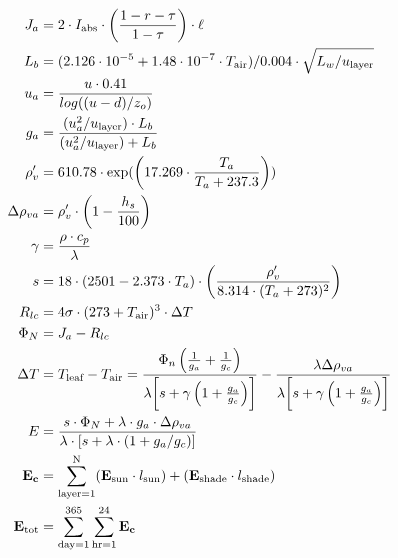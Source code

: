 \documentclass[10pt]{article}
\renewcommand{\marginnote}[2][]{}
\begin{document}
\begin{align}
 J_a &= 2 \cdot I_{\text{abs}} \cdot \left(\frac{1-r-\tau}{1-\tau}\right) \cdot \ell \label{eqn:Ja} \\
 L_b &= (2.126 \cdot 10^{-5} + 1.48 \cdot 10^{-7} \cdot T_\text{air}) / 0.004 \cdot \sqrt{L_w / u_{\text{layer}}} \label{eqn:Lb}\\
 u_a &= \frac{u \cdot 0.41}{log((u-d)/z_o)} \hspace{3.1in} \label{eqn:ua} \marginnote{I can not reconcile units}\\
 g_a &= \frac{(u_{a}^{2}/u_{\text{layer}}) \cdot L_b}{(u_{a}^{2}/u_{\text{layer}}) + L_b} \label{eqn:ga} \marginnote{I can not reconcile units}\\
 \rho_{v}^{\prime} &= 610.78 \cdot \exp(\left( 17.269 \cdot \frac{T_a}{T_a + 237.3} \right)) \label{eqn:rhop} \\
 \Delta \rho_{va} &= \rho_{v}^{\prime} \cdot \left( 1-\frac{h_s}{100} \right) \label{eqn:Deltarho} \\
 \gamma &= \frac{\rho \cdot c_p}{\lambda} \label{eqn:gamma} \\
 s &= 18 \cdot (2501 - 2.373 \cdot T_a) \cdot \left(\frac{\rho_{v}^{\prime}}{8.314 \cdot (T_a + 273)^2} \right) \label{eqn:s} \\
 R_{lc} &= 4 \sigma \cdot (273+T_{\text{air}})^3 \cdot \Delta T \label{eqn:Rlc} \\
 \Phi_N &= J_a - R_{lc} \label{eqn:PhiN} \\
 \Delta T &= T_{\text{leaf}} - T_{\text{air}} = \frac{\Phi_n \left(\frac{1}{g_a}+\frac{1}{g_c} \right)}{\lambda \biggl[ s+ \gamma \left( 1 + \frac{g_a}{g_c} \right) \biggr]} - \frac{\lambda \Delta \rho_{va}}{\lambda \biggl[ s+\gamma\left(1+\frac{g_a}{g_c}\right) \biggr] } \label{eqn:DeltaT} \marginnote{should thermal conductivity be in this equation?} \\
 E &= \frac{ s \cdot \Phi_N + \lambda \cdot g_a \cdot \Delta \rho_{va}}{\lambda \cdot [ s + \lambda \cdot (1+g_a / g_c)]} \label{eqn:E} \\
 \mathbf{E_c} &= \sum_{\text{layer}=1}^\text{N} (\mathbf{E_{\text{sun}}} \cdot l_{\text{sun}}) + (\mathbf{E_{\text{shade}}} \cdot l_{\text{shade}}) \label{eqn:Ec}\\ 
 \mathbf{E_{\text{tot}}} &= \sum_{\text{day}=1}^{365}\sum_{\text{hr}=1}^{24}  \mathbf{E_c} \label{eqn:Etot}
\end{align}
\end{document}
